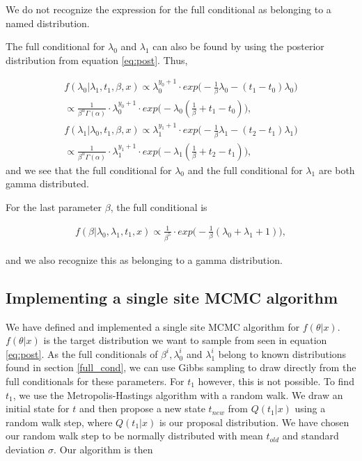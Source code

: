 We do not recognize the expression for the full conditional as belonging to a named distribution. 

The full conditional for $\lambda_0$ and $\lambda_1$ can also be found by using the posterior distribution from equation \ref{eq:post}. Thus, 

\begin{align}
    f(\lambda_0 | \lambda_1, t_1, \beta, x) \propto
    \lambda_0^{y_0 + 1}\cdot exp \Big( -\frac{1}{\beta} \lambda_0 - (t_1 - t_0)\lambda_0 \Big) 
    \nonumber \\
    \propto \frac{1}{\beta^{\alpha} \Gamma(\alpha)}\cdot \lambda_0^{y_0 + 1} \cdot exp \Big( - \lambda_0 (\frac{1}{\beta} + t_1 - t_0) \Big),
     \\
    f(\lambda_1 | \lambda_0, t_1, \beta, x) \propto
    \lambda_1^{y_1 + 1}\cdot exp \Big( -\frac{1}{\beta} \lambda_1 - (t_2 - t_1)\lambda_1 \Big) \nonumber \\
    \propto \frac{1}{\beta^{\alpha} \Gamma(\alpha)}\cdot \lambda_1^{y_1 + 1} \cdot exp \Big( - \lambda_1 (\frac{1}{\beta} + t_2 - t_1) \Big),
\end{align}
and we see that the full conditional for $\lambda_0$ and the full conditional for $\lambda_1$ are both gamma distributed. 



For the last parameter $\beta$, the full conditional is

\begin{align}
    f(\beta | \lambda_0, \lambda_1, t_1, x) \propto 
    \frac{1}{\beta^5} \cdot exp \Big( -\frac{1}{\beta}(\lambda_0 + \lambda_1 + 1) \Big),
\end{align}

and we also recognize this as belonging to a gamma distribution. 

\subsection{Implementing a single site MCMC algorithm}

We have defined and implemented a single site MCMC algorithm for $f(\theta |x)$. $f(\theta|x)$ is the target distribution we want to sample from seen in equation \ref{eq:post}.  As the full conditionals of $\beta^i, \lambda_0^i$ and $\lambda_1^i$ belong to known distributions found in section \ref{full_cond}, we can use Gibbs sampling to draw directly from the full conditionals for these parameters. For $t_1$ however, this is not possible.
To find $t_1$, we use the Metropolis-Hastings algorithm with a random walk. We draw an initial state for $t$ and then propose a new state $t_{new}$ from $Q(t_1|x)$ using a random walk step, where $Q(t_1|x)$ is our proposal distribution. We have chosen our random walk step to be normally distributed with mean $t_{old}$ and standard deviation $\sigma$.
Our algorithm is then

